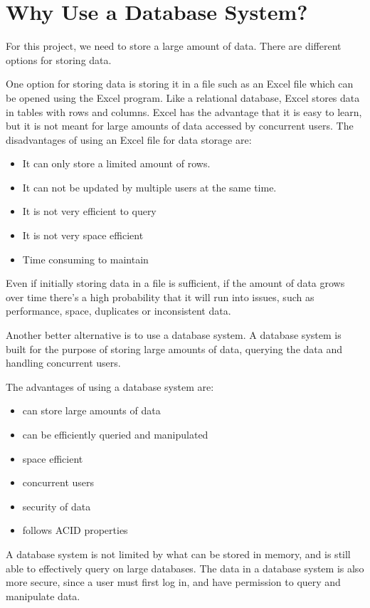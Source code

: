 \section{Why Use a Database System?}
For this project, we need to store a large amount of data. 
There are different options for storing data.

One option for storing data is storing it in a file such as an Excel file which can be opened using the Excel program. Like a relational database, Excel stores data in tables with rows and columns. Excel has the advantage that it is easy to learn, but it is not meant for large amounts of data accessed by concurrent users. 
The disadvantages of using an Excel file for data storage are:

\begin{itemize}
    \item It can only store a limited amount of rows. 
    \item It can not be updated by multiple users at the same time. 
    \item It is not very efficient to query
    \item It is not very space efficient
    \item Time consuming to maintain
\end{itemize}

Even if initially storing data in a file is sufficient, if the amount of data grows over time there's a high probability that it will run into issues, such as performance, space, duplicates or inconsistent data.
\cite{ExcelDatabase}

Another better alternative is to use a database system. A database system is built for the purpose of storing large amounts of data, querying the data and handling concurrent users.

The advantages of using a database system are:
\begin{itemize}
    \item can store large amounts of data
    \item can be efficiently queried and manipulated
    \item space efficient
    \item concurrent users
    \item security of data
    \item follows ACID properties
\end{itemize}

A database system is not limited by what can be stored in memory, and is still able to effectively query on large databases. The data in a database system is also more secure, since a user must first log in, and have permission to query and manipulate data. 
\cite{WhyDatabase}

